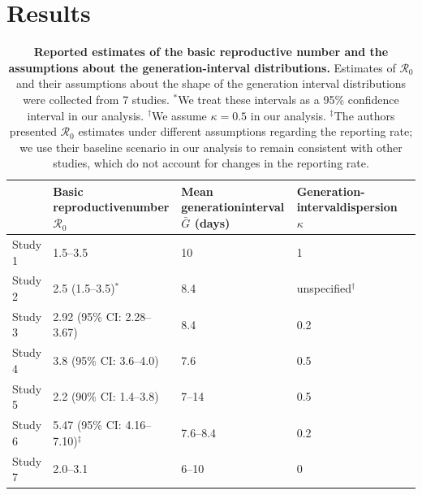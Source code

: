 \documentclass[12pt]{article}
\newcommand{\Ro}{\ensuremath{{\mathcal R}_{0}}\xspace}
\begin{document}
\section{Results}

\begin{table}[t]
\begin{center}
\scriptsize
\begin{tabular}{l|p{3.5cm}|p{2.5cm}|p{2.7cm}|l}
 & Basic reproductive\newline number \Ro & Mean generation\newline interval $\bar G$ (days) & Generation-interval\newline dispersion $\kappa$ \\
\hline
Study 1 & 1.5--3.5 & 10 & 1 & \cite{bedfordncov} \\
\hline
Study 2 & 2.5 (1.5--3.5)$^\ast$ & 8.4 & unspecified$^\dagger$ & \cite{imaincov} \\
\hline
Study 3 & 2.92 (95\% CI: 2.28--3.67) & 8.4 & 0.2 & \cite{liuncov} \\
\hline
Study 4 & 3.8 (95\% CI: 3.6--4.0) & 7.6 & 0.5 & \cite{readncov} \\
\hline
Study 5 & 2.2 (90\% CI: 1.4--3.8) & 7--14 & 0.5 & \cite{riouncov} \\
\hline
Study 6 & 5.47 (95\% CI: 4.16--7.10)$^\ddagger$ & 7.6--8.4 & 0.2 & \cite{zhaoncov} \\
\hline
Study 7 & 2.0--3.1 & 6--10 & 0 & \cite{majumderncov} \\
\hline
\end{tabular}
\end{center}
\caption{
\textbf{Reported estimates of the basic reproductive number and the assumptions about the generation-interval distributions.}
Estimates of \Ro and their assumptions about the shape of the generation interval distributions were collected from 7 studies.
$^\ast$We treat these intervals as a 95\% confidence interval in our analysis.
$^\dagger$We assume $\kappa = 0.5$ in our analysis.
$^\ddagger$The authors presented \Ro estimates under different assumptions regarding the reporting rate; we use their baseline scenario in our analysis to remain consistent with other studies, which do not account for changes in the reporting rate.
}
\end{table}
\end{document}
